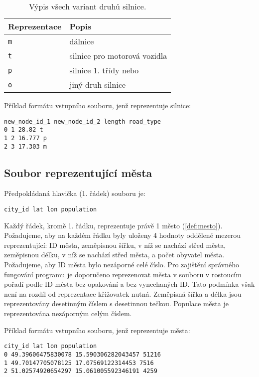 \begin{table}
\centering\footnotesize\sf
\begin{tabular}{ll}
\toprule
Reprezentace & Popis \\
\midrule
\texttt{m} & dálnice  \\
\texttt{t} & silnice pro motorová vozidla \\
\texttt{p} & silnice 1. třídy nebo  \\
\texttt{o} & jiný druh silnice \\
\bottomrule
\end{tabular}
\caption{Výpis všech variant druhů silnice.}
\label{tab:typy_silnice}
\end{table}
    

Příklad formátu vstupního souboru, jenž reprezentuje silnice:
\begin{Verbatim}
new_node_id_1 new_node_id_2 length road_type
0 1 28.82 t 
1 2 16.777 p
2 3 17.303 m
\end{Verbatim}


\subsection{Soubor reprezentující města}
\label{subsec:reprezentace_mesta}

Předpokládaná hlavička (1. řádek) souboru je:
\begin{Verbatim}
city_id lat lon population
\end{Verbatim}
Každý řádek, kromě 1. řádku, reprezentuje právě 1 město (\cref{def:mesto}).
Požadujeme, aby na každém řádku byly uloženy 4 hodnoty oddělené mezerou reprezentující:
ID města, zeměpisnou šířku, v níž se nachází střed města, zeměpisnou délku, v 
níž se nachází střed města, a počet obyvatel města.
Požadujeme, aby ID města bylo nezáporné celé číslo. Pro zajištění správného 
fungování programu je doporučeno reprezenovat města v souboru v rostoucím
pořadí podle ID města bez opakování a bez vynechaných ID. Tato podmínka 
však není na rozdíl od reprezentace křižovatek nutná.
Zeměpisná šířka a délka jsou reprezentovány desetinným číslem s desetinnou 
tečkou. Populace města je reprezentována nezáporným celým číslem.

Příklad formátu vstupního souboru, jenž reprezentuje  města:
\begin{Verbatim}
city_id lat lon population
0 49.39606475830078 15.590306282043457 51216 
1 49.70147705078125 17.07569122314453 7516 
2 51.02574920654297 15.061005592346191 4259 
\end{Verbatim}


